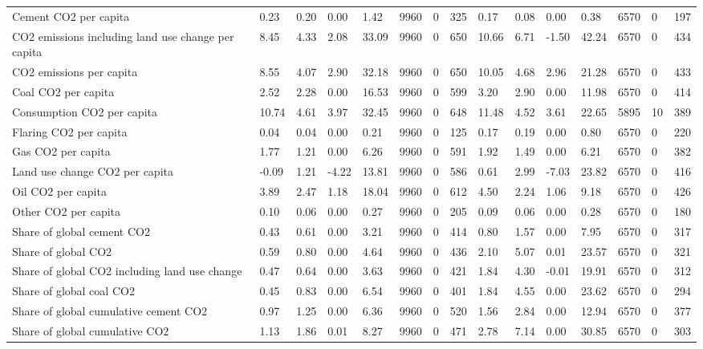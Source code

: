\begin{longtable}{lllllllllllllll}
\addlinespace
Cement CO2 per capita & 0.23 & 0.20 & 0.00 & 1.42 & 9960 & 0 & 325 & 0.17 & 0.08 & 0.00 & 0.38 & 6570 & 0 & 197\\
CO2 emissions including land use change per capita & 8.45 & 4.33 & 2.08 & 33.09 & 9960 & 0 & 650 & 10.66 & 6.71 & -1.50 & 42.24 & 6570 & 0 & 434\\
CO2 emissions per capita & 8.55 & 4.07 & 2.90 & 32.18 & 9960 & 0 & 650 & 10.05 & 4.68 & 2.96 & 21.28 & 6570 & 0 & 433\\
Coal CO2 per capita & 2.52 & 2.28 & 0.00 & 16.53 & 9960 & 0 & 599 & 3.20 & 2.90 & 0.00 & 11.98 & 6570 & 0 & 414\\
Consumption CO2 per capita & 10.74 & 4.61 & 3.97 & 32.45 & 9960 & 0 & 648 & 11.48 & 4.52 & 3.61 & 22.65 & 5895 & 10 & 389\\
\addlinespace
Flaring CO2 per capita & 0.04 & 0.04 & 0.00 & 0.21 & 9960 & 0 & 125 & 0.17 & 0.19 & 0.00 & 0.80 & 6570 & 0 & 220\\
Gas CO2 per capita & 1.77 & 1.21 & 0.00 & 6.26 & 9960 & 0 & 591 & 1.92 & 1.49 & 0.00 & 6.21 & 6570 & 0 & 382\\
Land use change CO2 per capita & -0.09 & 1.21 & -4.22 & 13.81 & 9960 & 0 & 586 & 0.61 & 2.99 & -7.03 & 23.82 & 6570 & 0 & 416\\
Oil CO2 per capita & 3.89 & 2.47 & 1.18 & 18.04 & 9960 & 0 & 612 & 4.50 & 2.24 & 1.06 & 9.18 & 6570 & 0 & 426\\
Other CO2 per capita & 0.10 & 0.06 & 0.00 & 0.27 & 9960 & 0 & 205 & 0.09 & 0.06 & 0.00 & 0.28 & 6570 & 0 & 180\\
\addlinespace
Share of global cement CO2 & 0.43 & 0.61 & 0.00 & 3.21 & 9960 & 0 & 414 & 0.80 & 1.57 & 0.00 & 7.95 & 6570 & 0 & 317\\
Share of global CO2 & 0.59 & 0.80 & 0.00 & 4.64 & 9960 & 0 & 436 & 2.10 & 5.07 & 0.01 & 23.57 & 6570 & 0 & 321\\
Share of global CO2 including land use change & 0.47 & 0.64 & 0.00 & 3.63 & 9960 & 0 & 421 & 1.84 & 4.30 & -0.01 & 19.91 & 6570 & 0 & 312\\
Share of global coal CO2 & 0.45 & 0.83 & 0.00 & 6.54 & 9960 & 0 & 401 & 1.84 & 4.55 & 0.00 & 23.62 & 6570 & 0 & 294\\
Share of global cumulative cement CO2 & 0.97 & 1.25 & 0.00 & 6.36 & 9960 & 0 & 520 & 1.56 & 2.84 & 0.00 & 12.94 & 6570 & 0 & 377\\
\addlinespace
Share of global cumulative CO2 & 1.13 & 1.86 & 0.01 & 8.27 & 9960 & 0 & 471 & 2.78 & 7.14 & 0.00 & 30.85 & 6570 & 0 & 303\\

\end{longtable}
